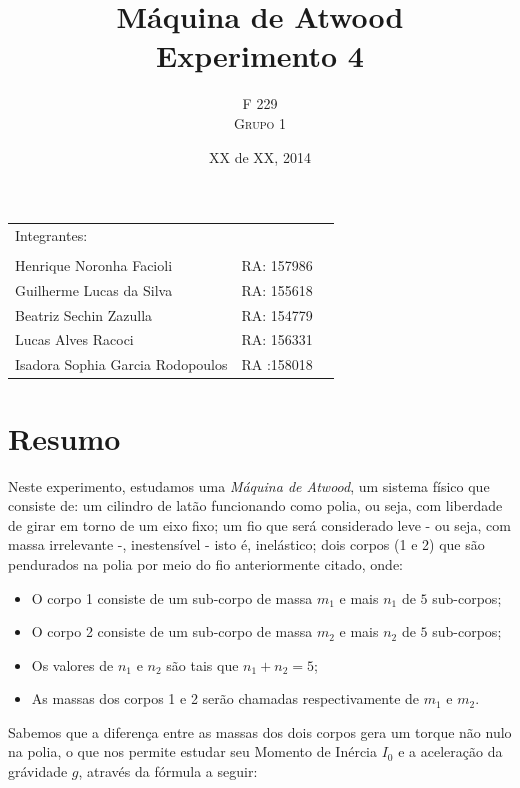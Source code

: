 \documentclass[a4paper]{article}
\title{Máquina de Atwood \\ Experimento 4} %
\author{F 229 \\ \textsc{Grupo 1}}
\date{XX de XX, 2014}
\begin{document}
\maketitle

\begin{center}
	\begin{tabular}{l r l}
		Integrantes:\\\\
		 Henrique Noronha Facioli & RA: 157986 \\
		 Guilherme Lucas da Silva & RA: 155618 \\
		 Beatriz Sechin Zazulla & RA: 154779 \\
		 Lucas Alves Racoci & RA: 156331 \\
		 Isadora Sophia Garcia Rodopoulos & RA :158018 \\
	\end{tabular}
\end{center}


\section{Resumo}
Neste experimento, estudamos uma \emph{Máquina de Atwood}, um sistema físico que consiste de: um cilindro de latão funcionando como polia, ou seja, com liberdade de girar em torno de um eixo fixo; um fio que será considerado leve - ou seja, com massa irrelevante -, inestensível - isto é, inelástico; dois corpos (1 e 2) que são pendurados na polia por meio do fio anteriormente citado, onde:
\begin{itemize} 
	\item O corpo 1 consiste de um sub-corpo de massa ${m}_{1}$ e mais $n_{1}$ de $5$ sub-corpos; 
	\item O corpo 2 consiste de um sub-corpo de massa ${m}_{2}$ e mais $n_{2}$ de $5$ sub-corpos; 
	\item Os valores de $n_{1}$ e $n_{2}$ são tais que $n_{1}+n_{2}=5$; 
	\item As massas dos corpos 1 e 2 serão chamadas respectivamente de $m_{1}$ e $m_{2}$.
\end {itemize} 

Sabemos que a diferença entre as massas dos dois corpos gera um torque não nulo na polia, o que nos permite estudar seu Momento de Inércia $I_{0}$ e a aceleração da grávidade $g$, através da fórmula a seguir:
\end{document}
